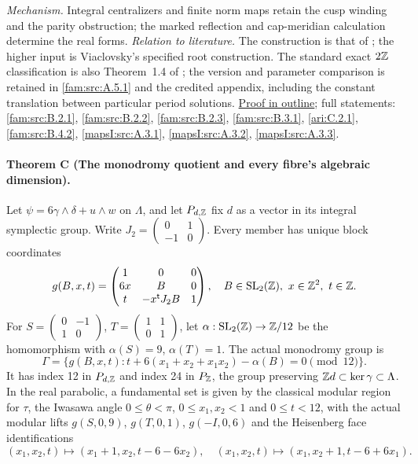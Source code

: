 \documentclass[11pt,a4paper]{article}
\theoremstyle{definition}
\begin{document}
\textit{Mechanism.} Integral centralizers and finite norm maps
retain the cusp winding and the parity obstruction; the marked
reflection and cap-meridian calculation determine the real forms.
\textit{Relation to literature.} The construction is that of
\cite{AC2026,Engel2026}; the higher input is Viaclovsky's specified
root construction.  The standard exact $2\mathbb Z$ classification is
also Theorem~1.4 of \cite{DuEtAl2026v1}; the version and parameter
comparison is retained in \ref{fam:src:A.5.1} and the credited
appendix, including the constant translation between particular
period solutions.
\hyperlink{outline-I-B}{Proof in outline}; full statements:
\ref{fam:src:B.2.1}, \ref{fam:src:B.2.2}, \ref{fam:src:B.2.3},
\ref{fam:src:B.3.1}, \ref{ari:C.2.1}, \ref{fam:src:B.4.2},
\ref{mapsI:src:A.3.1}, \ref{mapsI:src:A.3.2},
\ref{mapsI:src:A.3.3}.

\hypertarget{main-I-C}{}
\paragraph{Theorem C (The monodromy quotient and every fibre's algebraic dimension).}
\label{series:I:C}
Let $\psi=6\gamma\wedge\delta+u\wedge w$ on $\Lambda$, and
let $P_{d,\mathbb Z}$ fix $d$ as a vector in its integral symplectic
group.  Write $J_2=\left(\begin{smallmatrix}0&1\\-1&0\end{smallmatrix}\right)$.
Every member has unique block coordinates
\[
 g(B,x,t)=\begin{pmatrix}1&0&0\\6x&B&0\\
                   t&-x^{\mathsf t}J_2B&1\end{pmatrix},
 \quad B\in\operatorname{SL}_2(\mathbb Z),\ x\in\mathbb Z^2,\ t\in\mathbb Z.
\]
For $S=\left(\begin{smallmatrix}0&-1\\1&0\end{smallmatrix}\right)$,
$T=\left(\begin{smallmatrix}1&1\\0&1\end{smallmatrix}\right)$,
let $\alpha:\operatorname{SL}_2(\mathbb Z)\to\mathbb Z/12$ be the homomorphism
with $\alpha(S)=9$, $\alpha(T)=1$.  The actual monodromy group is
\[
 \Gamma=\{g(B,x,t):t+6(x_1+x_2+x_1x_2)-\alpha(B)=0\pmod{12}\}.
\]
It has index 12 in $P_{d,\mathbb Z}$ and index 24 in $P_\mathbb Z$, the group preserving
$\mathbb Z d\subset\ker\gamma\subset\Lambda$.  In the real parabolic,
a fundamental set is given by the classical modular region for
$\tau$, the Iwasawa angle $0\le\theta<\pi$,
$0\le x_1,x_2<1$ and $0\le t<12$, with the actual modular
lifts $g(S,0,9)$, $g(T,0,1)$, $g(-I,0,6)$ and the Heisenberg
face identifications
\[
 (x_1,x_2,t)\mapsto(x_1+1,x_2,t-6-6x_2),\quad
 (x_1,x_2,t)\mapsto(x_1,x_2+1,t-6+6x_1).
\]
\end{document}
